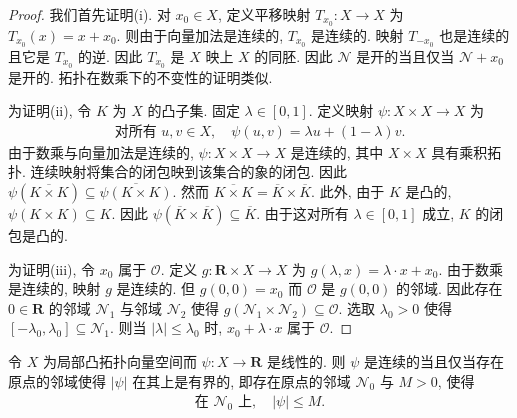 \documentclass[../../main.tex]{subfiles}
\begin{document}
\begin{proof}
我们首先证明(i). 对 $x_{0}\in X$, 定义平移映射 $T_{x_{0}}:X\to X$ 为 $T_{x_{0}}(x)=x+x_{0}$. 则由于向量加法是连续的, $T_{x_{0}}$ 是连续的. 映射 $T_{-x_{0}}$ 也是连续的且它是 $T_{x_{0}}$ 的逆. 因此 $T_{x_{0}}$ 是 $X$ 映上 $X$ 的同胚. 因此 $\mathcal{N}$ 是开的当且仅当 $\mathcal{N}+x_{0}$ 是开的. 拓扑在数乘下的不变性的证明类似.

为证明(ii), 令 $K$ 为 $X$ 的凸子集. 固定 $\lambda\in[0,1]$. 定义映射 $\psi:X\times X\to X$ 为
\begin{align*}
\text{对所有 }u,v\in X,\quad\psi(u,v)=\lambda u+(1-\lambda)v.
\end{align*}
由于数乘与向量加法是连续的, $\psi:X\times X\to X$ 是连续的, 其中 $X\times X$ 具有乘积拓扑. 连续映射将集合的闭包映到该集合的象的闭包. 因此 $\psi(\overline{K\times K})\subseteq\overline{\psi(K\times K)}$. 然而 $\overline{K\times K}=\overline{K}\times\overline{K}$. 此外, 由于 $K$ 是凸的, $\psi(K\times K)\subseteq K$. 因此 $\psi(\overline{K}\times\overline{K})\subseteq\overline{K}$. 由于这对所有 $\lambda\in[0,1]$ 成立, $K$ 的闭包是凸的.

为证明(iii), 令 $x_{0}$ 属于 $\mathcal{O}$. 定义 $g:\mathbf{R}\times X\to X$ 为 $g(\lambda,x)=\lambda\cdot x+x_{0}$. 由于数乘是连续的, 映射 $g$ 是连续的. 但 $g(0,0)=x_{0}$ 而 $\mathcal{O}$ 是 $g(0,0)$ 的邻域. 因此存在 $0\in\mathbf{R}$ 的邻域 $\mathcal{N}_{1}$ 与邻域 $\mathcal{N}_{2}$ 使得 $g(\mathcal{N}_{1}\times\mathcal{N}_{2})\subseteq\mathcal{O}$. 选取 $\lambda_{0}>0$ 使得 $[-\lambda_{0},\lambda_{0}]\subseteq\mathcal{N}_{1}$. 则当 $|\lambda|\leqslant\lambda_{0}$ 时, $x_{0}+\lambda\cdot x$ 属于 $\mathcal{O}$.
\end{proof}

\begin{proposition}\label{proposition:ch14-连续泛函判据}
令 $X$ 为局部凸拓扑向量空间而 $\psi:X\to\mathbf{R}$ 是线性的. 则 $\psi$ 是连续的当且仅当存在原点的邻域使得 $|\psi|$ 在其上是有界的, 即存在原点的邻域 $\mathcal{N}_{0}$ 与 $M>0$, 使得
\begin{align}
\text{在 }\mathcal{N}_{0}\text{ 上},\quad|\psi|\leqslant M.\label{align:ch14-连续判据}
\end{align}
\end{proposition}
\end{document}
